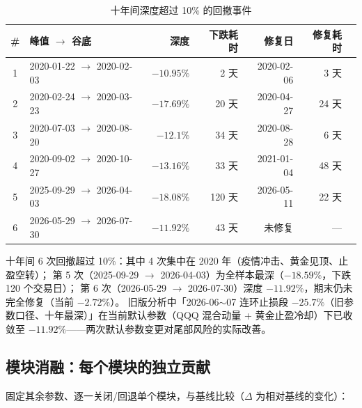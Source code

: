 \documentclass[11pt]{ctexart}
\newcommand{\red}[1]{\textcolor{accent}{#1}}   %
\begin{document}
\begin{table}[htbp]
\centering
\caption{十年间深度超过 10\% 的回撤事件}
\begin{tabular}{clrrrrr}
\toprule
\# & 峰值 $\rightarrow$ 谷底 & 深度 & 下跌耗时 & 修复日 & 修复耗时 \\
\midrule
1 & 2020-01-22 $\rightarrow$ 2020-02-03 & \red{$-10.95\%$} & 2 天 & 2020-02-06 & 3 天 \\
2 & 2020-02-24 $\rightarrow$ 2020-03-23 & \red{$-17.69\%$} & 20 天 & 2020-04-27 & 24 天 \\
3 & 2020-07-03 $\rightarrow$ 2020-08-20 & \red{$-12.1\%$} & 34 天 & 2020-08-28 & 6 天 \\
4 & 2020-09-02 $\rightarrow$ 2020-10-27 & \red{$-13.16\%$} & 33 天 & 2021-01-04 & 48 天 \\
5 & 2025-09-29 $\rightarrow$ 2026-04-03 & \red{$-18.08\%$} & 120 天 & 2026-05-11 & 22 天 \\
6 & 2026-05-29 $\rightarrow$ 2026-07-30 & \red{$-11.92\%$} & 43 天 & 未修复 & — \\
\bottomrule
\end{tabular}
\end{table}

十年间 6 次回撤超过 10\%：其中 4 次集中在 2020 年（疫情冲击、黄金见顶、止盈空转）；
第 5 次（2025-09-29 $\rightarrow$ 2026-04-03）为全样本最深（\red{$-18.59\%$}，下跌 120 个交易日）；
第 6 次（2026-05-29 $\rightarrow$ 2026-07-30）深度 $-11.92\%$，期末仍未完全修复（当前 $-2.72\%$）。
旧版分析中「2026-06$\sim$07 连环止损段 $-25.7\%$（旧参数口径、十年最深）」在当前默认参数（QQQ 混合动量 + 黄金止盈冷却）下已收敛至 $-11.92\%$——两次默认参数变更对尾部风险的实际改善。

\subsection{模块消融：每个模块的独立贡献}

固定其余参数、逐一关闭/回退单个模块，与基线比较（$\Delta$ 为相对基线的变化）：
\end{document}
